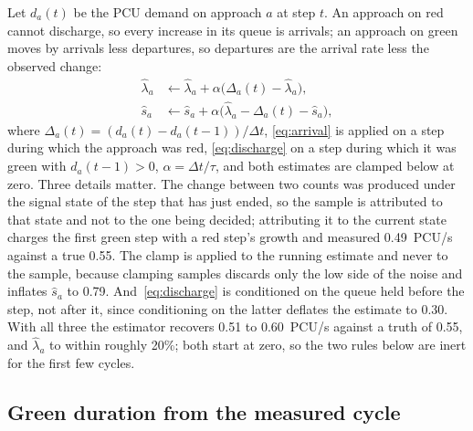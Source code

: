 \documentclass[journal]{IEEEtran}
\newcommand{\pcu}{PCU}
\begin{document}
Let $d_a(t)$ be the \pcu{} demand on approach $a$ at step $t$. An approach on red cannot discharge, so every
increase in its queue is arrivals; an approach on green moves by arrivals less departures, so departures are
the arrival rate less the observed change:
\begin{align}
\hat{\lambda}_a &\leftarrow \hat{\lambda}_a + \alpha\big(\Delta_a(t) - \hat{\lambda}_a\big),
\label{eq:arrival}\\
\hat{s}_a &\leftarrow \hat{s}_a + \alpha\big(\hat{\lambda}_a - \Delta_a(t) - \hat{s}_a\big),
\label{eq:discharge}
\end{align}
where $\Delta_a(t) = (d_a(t) - d_a(t-1))/\Delta t$, \eqref{eq:arrival} is applied on a step during which the
approach was red, \eqref{eq:discharge} on a step during which it was green with $d_a(t-1) > 0$, $\alpha = \Delta t / \tau$, and both estimates are clamped below at zero. Three details matter. The change between two counts was produced under the signal state of the step that has
just ended, so the sample is attributed to that state and not to the one being decided; attributing it to the
current state charges the first green step with a red step's growth and measured 0.49~\pcu/s against a true
0.55. The clamp is applied to the running estimate and never to the sample, because clamping samples discards
only the low side of the noise and inflates $\hat{s}_a$ to 0.79. And~\eqref{eq:discharge} is conditioned on
the queue held before the step, not after it, since conditioning on the latter deflates the estimate to 0.30.
With all three the estimator recovers 0.51 to 0.60~\pcu/s against a truth of 0.55, and $\hat{\lambda}_a$
to within roughly 20\%; both start at zero, so the two rules below are inert for the first few cycles.

\subsection{Green duration from the measured cycle}
\label{sec:floor}
\end{document}
